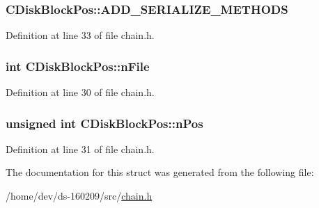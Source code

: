 \subsubsection[{A\+D\+D\+\_\+\+S\+E\+R\+I\+A\+L\+I\+Z\+E\+\_\+\+M\+E\+T\+H\+O\+D\+S}]{\setlength{\rightskip}{0pt plus 5cm}C\+Disk\+Block\+Pos\+::\+A\+D\+D\+\_\+\+S\+E\+R\+I\+A\+L\+I\+Z\+E\+\_\+\+M\+E\+T\+H\+O\+D\+S}\label{struct_c_disk_block_pos_a958cd730b290bbb0153d514c56517590}


Definition at line 33 of file chain.\+h.

\hypertarget{struct_c_disk_block_pos_a09f30dab5c02fbdea8a17f9bcee5aac8}{}
\subsubsection[{n\+File}]{\setlength{\rightskip}{0pt plus 5cm}int C\+Disk\+Block\+Pos\+::n\+File}\label{struct_c_disk_block_pos_a09f30dab5c02fbdea8a17f9bcee5aac8}


Definition at line 30 of file chain.\+h.

\hypertarget{struct_c_disk_block_pos_a9b4b5e149b655ac5c22d05883b5bca0e}{}
\subsubsection[{n\+Pos}]{\setlength{\rightskip}{0pt plus 5cm}unsigned int C\+Disk\+Block\+Pos\+::n\+Pos}\label{struct_c_disk_block_pos_a9b4b5e149b655ac5c22d05883b5bca0e}


Definition at line 31 of file chain.\+h.



The documentation for this struct was generated from the following file\+:\begin{DoxyCompactItemize}
\item 
/home/dev/ds-\/160209/src/\hyperlink{chain_8h}{chain.\+h}\end{DoxyCompactItemize}
